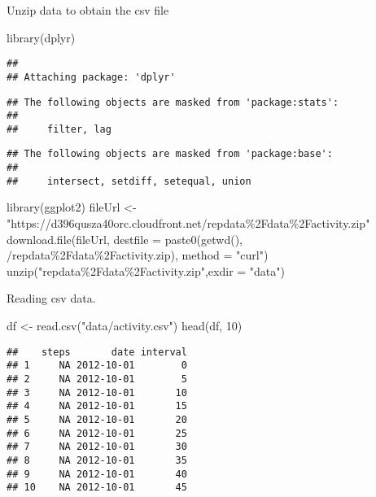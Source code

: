 \documentclass[
]{article}
\newenvironment{Shaded}{\begin{snugshade}}{\end{snugshade}}
\newcommand{\AttributeTok}[1]{\textcolor[rgb]{0.77,0.63,0.00}{#1}}
\newcommand{\DecValTok}[1]{\textcolor[rgb]{0.00,0.00,0.81}{#1}}
\newcommand{\FunctionTok}[1]{\textcolor[rgb]{0.00,0.00,0.00}{#1}}
\newcommand{\NormalTok}[1]{#1}
\newcommand{\OtherTok}[1]{\textcolor[rgb]{0.56,0.35,0.01}{#1}}
\newcommand{\StringTok}[1]{\textcolor[rgb]{0.31,0.60,0.02}{#1}}
\begin{document}
Unzip data to obtain the csv file

\begin{Shaded}
\begin{Highlighting}[]
\FunctionTok{library}\NormalTok{(dplyr)}
\end{Highlighting}
\end{Shaded}

\begin{verbatim}
## 
## Attaching package: 'dplyr'
\end{verbatim}

\begin{verbatim}
## The following objects are masked from 'package:stats':
## 
##     filter, lag
\end{verbatim}

\begin{verbatim}
## The following objects are masked from 'package:base':
## 
##     intersect, setdiff, setequal, union
\end{verbatim}

\begin{Shaded}
\begin{Highlighting}[]
\FunctionTok{library}\NormalTok{(ggplot2)}
\NormalTok{fileUrl }\OtherTok{\textless{}{-}} \StringTok{"https://d396qusza40orc.cloudfront.net/repdata\%2Fdata\%2Factivity.zip"}
\FunctionTok{download.file}\NormalTok{(fileUrl, }\AttributeTok{destfile =} \FunctionTok{paste0}\NormalTok{(}\FunctionTok{getwd}\NormalTok{(), }\StringTok{\textquotesingle{}/repdata\%2Fdata\%2Factivity.zip\textquotesingle{}}\NormalTok{), }\AttributeTok{method =} \StringTok{"curl"}\NormalTok{)}
\FunctionTok{unzip}\NormalTok{(}\StringTok{"repdata\%2Fdata\%2Factivity.zip"}\NormalTok{,}\AttributeTok{exdir =} \StringTok{"data"}\NormalTok{)}
\end{Highlighting}
\end{Shaded}

Reading csv data.

\begin{Shaded}
\begin{Highlighting}[]
\NormalTok{df }\OtherTok{\textless{}{-}} \FunctionTok{read.csv}\NormalTok{(}\StringTok{"data/activity.csv"}\NormalTok{)}
\FunctionTok{head}\NormalTok{(df, }\DecValTok{10}\NormalTok{)}
\end{Highlighting}
\end{Shaded}

\begin{verbatim}
##    steps       date interval
## 1     NA 2012-10-01        0
## 2     NA 2012-10-01        5
## 3     NA 2012-10-01       10
## 4     NA 2012-10-01       15
## 5     NA 2012-10-01       20
## 6     NA 2012-10-01       25
## 7     NA 2012-10-01       30
## 8     NA 2012-10-01       35
## 9     NA 2012-10-01       40
## 10    NA 2012-10-01       45
\end{verbatim}
\end{document}
